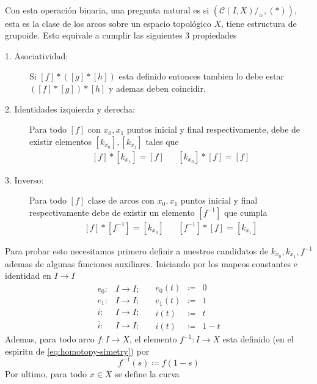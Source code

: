 \paragraph{} Con esta operación binaria, una pregunta natural es si
\((\mathcal C (I , X)/_\simeq , (*))\), esta es la clase de los arcos
sobre un espacio topológico \(X\), tiene estructura de grupoide. Esto
equivale a cumplir las siguientes 3 propiedades
\begin{description}
\item[1. Asociatividad:] Si \([f] * ([g] * [h])\) esta definido entonces
  tambien lo debe estar \(([f] * [g]) * [h]\) y ademas deben coincidir.
\item[2. Identidades izquierda y derecha:] Para todo \([f]\) con
  \(x_0, x_1\) puntos inicial y final respectivamente, debe de
existir elementos \([k_{x_0}], [k_{x_1}]\) tales que
\[ \begin{matrix}
    [f] * [k_{x_1}] = [f] & & [k_{x_0}] * [f] = [f]
  \end{matrix}
\]
\item[3. Inverso:] Para todo \([f]\) clase de arcos con \(x_0, x_1\)
  puntos inicial y final respectivamente debe de existir un elemento
  \([f^{-1}]\) que cumpla
\[ \begin{matrix}
    [f] * [f^{-1}] = [k_{x_0}] & & [f^{-1}] * [f] = [k_{x_1}]
  \end{matrix}
\]
\end{description}
Para probar esto necesitamos primero definir a nuestros candidatos de
\(k_{x_0}, k_{x_1}, f^{-1}\) ademas de algunas funciones auxiliares.
Iniciando por los mapeos constantes e identidad en \(I \to I\)
\[
  \begin{matrix}
     e_0 :     & I \to I; \\
     e_1 :     & I \to I; \\
     i :       & I \to I; \\
     \bar{i} : & I \to I;
   \end{matrix}
   \quad
   \begin{matrix}
      e_0(t) &\coloneqq &0 \\
      e_1(t) &\coloneqq &1 \\
      i(t)   &\coloneqq &t   \\
      i(t)   &\coloneqq &1 - t
   \end{matrix}
\]
Ademas, para todo arco \(f : I \to X \), el elemento \(f^{-1} : I \to X \) esta
definido (en el espiritu de \eqref{eq:homotopy-simetry}) por
\[ f^{-1} (s) \coloneqq f (1 - s) \]
Por ultimo, para todo \(x \in X \) se define la curva

